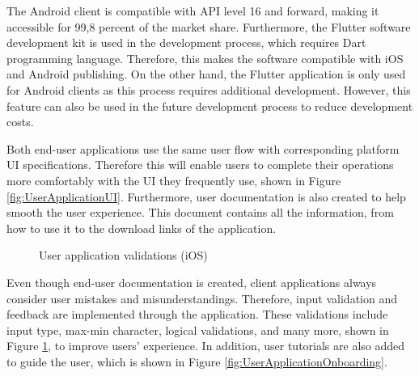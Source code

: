 The Android client is compatible with API level 16 and forward, making it accessible for 99,8 percent of the market share. Furthermore, the Flutter software development kit is used in the development process, which requires Dart programming language. Therefore, this makes the software compatible with iOS and Android publishing. On the other hand, the Flutter application is only used for Android clients as this process requires additional development. However, this feature can also be used in the future development process to reduce development costs.

Both end-user applications use the same user flow with corresponding platform UI specifications. Therefore this will enable users to complete their operations more comfortably with the UI they frequently use, shown in Figure \ref{fig:UserApplicationUI}. Furthermore, user documentation is also created to help smooth the user experience. This document contains all the information, from how to use it to the download links of the application. 

\begin{figure}[htbp]
\centering
{}
\caption{User application validations (iOS)}
\label{fig:UserApplicationValidations}
\end{figure}

Even though end-user documentation is created, client applications always consider user mistakes and misunderstandings. Therefore, input validation and feedback are implemented through the application. These validations include input type, max-min character, logical validations, and many more, shown in Figure \ref{fig:UserApplicationValidations}, to improve users' experience. In addition, user tutorials are also added to guide the user, which is shown in Figure \ref{fig:UserApplicationOnboarding}.


